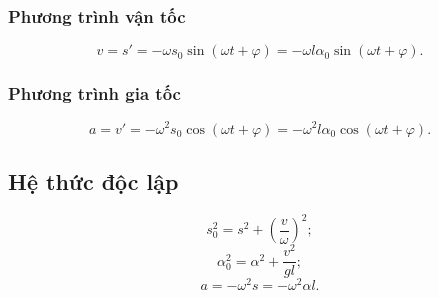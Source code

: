 \subsubsection{Phương trình vận tốc}
\begin{equation*}
	v=s'=-\omega s_0 \sin(\omega t +\varphi) = -\omega l \alpha_0 \sin(\omega t + \varphi).
\end{equation*}
\subsubsection{Phương trình gia tốc} 
\begin{equation*}
	a=v' = -\omega^2 s_0 \cos (\omega t + \varphi) = -\omega^2 l\alpha_0 \cos (\omega t +\varphi ).
\end{equation*}
\subsection{Hệ thức độc lập}
\begin{equation*}
	s^2_0 =s^2+\left(\dfrac{v}{\omega}\right)^2;
\end{equation*}
\begin{equation*}
	\alpha^2_0 = \alpha^2 +\dfrac{v^2}{gl};
\end{equation*}
\begin{equation*}
	a= - \omega^2 s=-\omega^2 \alpha l.
\end{equation*}
